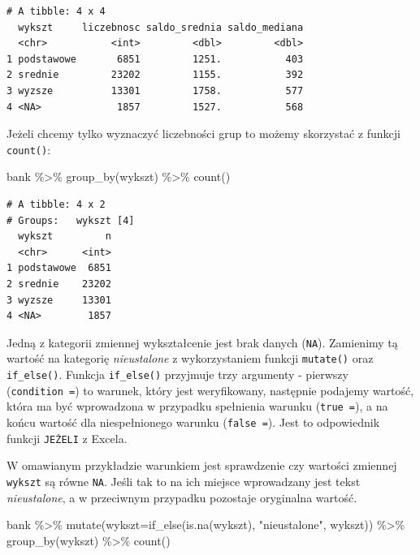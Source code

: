 \documentclass[
  letterpaper,
  DIV=11,
  numbers=noendperiod]{scrreprt}
\newenvironment{Shaded}{\begin{snugshade}}{\end{snugshade}}
\newcommand{\AttributeTok}[1]{\textcolor[rgb]{0.40,0.45,0.13}{#1}}
\newcommand{\FunctionTok}[1]{\textcolor[rgb]{0.28,0.35,0.67}{#1}}
\newcommand{\NormalTok}[1]{\textcolor[rgb]{0.00,0.23,0.31}{#1}}
\newcommand{\SpecialCharTok}[1]{\textcolor[rgb]{0.37,0.37,0.37}{#1}}
\newcommand{\StringTok}[1]{\textcolor[rgb]{0.13,0.47,0.30}{#1}}
\begin{document}
\begin{verbatim}
# A tibble: 4 x 4
  wykszt     liczebnosc saldo_srednia saldo_mediana
  <chr>           <int>         <dbl>         <dbl>
1 podstawowe       6851         1251.           403
2 srednie         23202         1155.           392
3 wyzsze          13301         1758.           577
4 <NA>             1857         1527.           568
\end{verbatim}

Jeżeli chcemy tylko wyznaczyć liczebności grup to możemy skorzystać z
funkcji \texttt{count()}:

\begin{Shaded}
\begin{Highlighting}[]
\NormalTok{bank }\SpecialCharTok{\%\textgreater{}\%}
  \FunctionTok{group\_by}\NormalTok{(wykszt) }\SpecialCharTok{\%\textgreater{}\%}
  \FunctionTok{count}\NormalTok{()}
\end{Highlighting}
\end{Shaded}

\begin{verbatim}
# A tibble: 4 x 2
# Groups:   wykszt [4]
  wykszt         n
  <chr>      <int>
1 podstawowe  6851
2 srednie    23202
3 wyzsze     13301
4 <NA>        1857
\end{verbatim}

Jedną z kategorii zmiennej wykształcenie jest brak danych (\texttt{NA}).
Zamienimy tą wartość na kategorię \emph{nieustalone} z wykorzystaniem
funkcji \texttt{mutate()} oraz \texttt{if\_else()}. Funkcja
\texttt{if\_else()} przyjmuje trzy argumenty - pierwszy
(\texttt{condition\ =}) to warunek, który jest weryfikowany, następnie
podajemy wartość, która ma być wprowadzona w przypadku spełnienia
warunku (\texttt{true\ =}), a na końcu wartość dla niespełnionego
warunku (\texttt{false\ =}). Jest to odpowiednik funkcji \texttt{JEŻELI}
z Excela.

W omawianym przykładzie warunkiem jest sprawdzenie czy wartości zmiennej
\texttt{wykszt} są równe \texttt{NA}. Jeśli tak to na ich miejsce
wprowadzany jest tekst \emph{nieustalone}, a w przeciwnym przypadku
pozostaje oryginalna wartość.

\begin{Shaded}
\begin{Highlighting}[]
\NormalTok{bank }\SpecialCharTok{\%\textgreater{}\%}
  \FunctionTok{mutate}\NormalTok{(}\AttributeTok{wykszt=}\FunctionTok{if\_else}\NormalTok{(}\FunctionTok{is.na}\NormalTok{(wykszt), }\StringTok{"nieustalone"}\NormalTok{, wykszt)) }\SpecialCharTok{\%\textgreater{}\%}
  \FunctionTok{group\_by}\NormalTok{(wykszt) }\SpecialCharTok{\%\textgreater{}\%}
  \FunctionTok{count}\NormalTok{()}
\end{Highlighting}
\end{Shaded}
\end{document}

